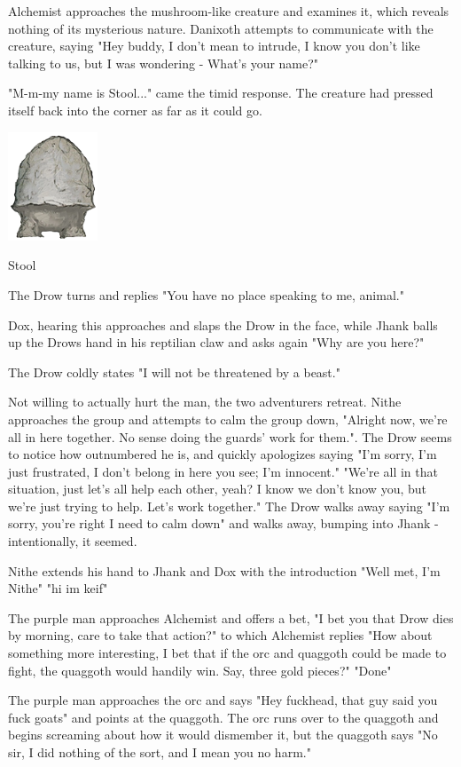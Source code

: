 \documentclass[letterpaper,10pt,twoside,twocolumn,openany]{book}
\begin{document}
Alchemist approaches the mushroom-like creature and examines it, which reveals nothing of its mysterious nature. Danixoth attempts to communicate with the creature, saying "Hey buddy, I don't mean to intrude, I know you don't like talking to us, but I was wondering - What's your name?"

"M-m-my name is Stool..." came the timid response. The creature had pressed itself back into the corner as far as it could go.
{\centering
	\includegraphics[width=0.2\textwidth]{img/dist/stool.png}
	\caption{Stool\label{fig:stool}}
}


The Drow turns and replies "You have no place speaking to me, animal."

Dox, hearing this approaches and slaps the Drow in the face, while Jhank balls up the Drows hand in his reptilian claw and asks again "Why are you here?"

The Drow coldly states "I will not be threatened by a beast."

Not willing to actually hurt the man, the two adventurers retreat. Nithe approaches the group and attempts to calm the group down, "Alright now, we're all in here together. No sense doing the guards' work for them.". The Drow seems to notice how outnumbered he is, and quickly apologizes saying "I'm sorry, I'm just frustrated, I don't belong in here you see; I'm innocent."
"We're all in that situation, just let's all help each other, yeah? I know we don't know you, but we're just trying to help. Let's work together."
The Drow walks away saying "I'm sorry, you're right I need to calm down" and walks away, bumping into Jhank - intentionally, it seemed.

Nithe extends his hand to Jhank and Dox with the introduction "Well met, I'm Nithe" "hi im keif"

The purple man approaches Alchemist and offers a bet, "I bet you that Drow dies by morning, care to take that action?" to which Alchemist replies "How about something more interesting, I bet that if the orc and quaggoth could be made to fight, the quaggoth would handily win. Say, three gold pieces?" "Done"

The purple man approaches the orc and says "Hey fuckhead, that guy said you fuck goats" and points at the quaggoth. The orc runs over to the quaggoth and begins screaming about how it would dismember it, but the quaggoth says "No sir, I did nothing of the sort, and I mean you no harm."
\end{document}
